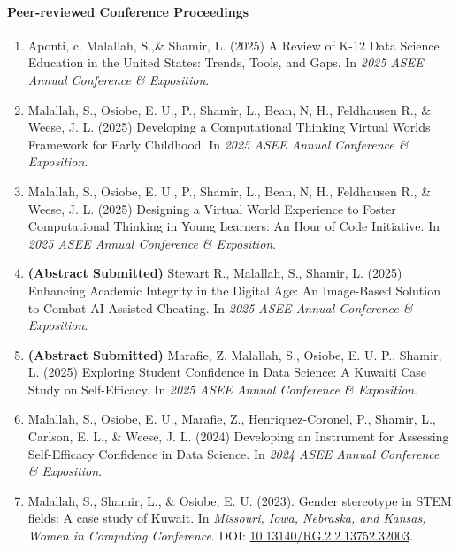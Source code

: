 \documentclass[11pt]{article}
\begin{document}
\paragraph{Peer-reviewed Conference Proceedings}
\begin{enumerate}
\item Aponti, c. Malallah, S.,\& Shamir, L. (2025) A Review of K-12 Data Science Education in the United States: Trends, Tools, and Gaps. In \textit{2025 ASEE Annual Conference \& Exposition}.

\item Malallah, S., Osiobe, E. U., P., Shamir, L., Bean, N, H., Feldhausen R., \& Weese, J. L. (2025) Developing a Computational Thinking Virtual Worlds Framework for Early Childhood. In \textit{2025 ASEE Annual Conference \& Exposition}.


\item Malallah, S., Osiobe, E. U., P., Shamir, L., Bean, N, H., Feldhausen R., \& Weese, J. L. (2025) Designing a Virtual World Experience to Foster Computational Thinking in Young Learners: An Hour of Code Initiative. In \textit{2025 ASEE Annual Conference \& Exposition}.

\item \textbf{(Abstract Submitted)} Stewart R., Malallah, S., Shamir, L. (2025) Enhancing Academic Integrity in the Digital Age: An Image-Based Solution to Combat AI-Assisted Cheating. In \textit{2025 ASEE Annual Conference \& Exposition}.

\item \textbf{(Abstract Submitted)} Marafie, Z. Malallah, S., Osiobe, E. U. P., Shamir, L. (2025) Exploring Student Confidence in Data Science: A Kuwaiti Case Study on Self-Efficacy. In \textit{2025 ASEE Annual Conference \& Exposition}.


\item Malallah, S., Osiobe, E. U., Marafie, Z., Henriquez-Coronel, P., Shamir, L., Carlson, E. L., \& Weese, J. L. (2024) Developing an Instrument for Assessing Self-Efficacy Confidence in Data Science. In \textit{2024 ASEE Annual Conference \& Exposition}.

\item Malallah, S., Shamir, L., \& Osiobe, E. U. (2023). Gender stereotype in STEM fields: A case study of Kuwait. In \textit{Missouri, Iowa, Nebraska, and Kansas, Women in Computing Conference}. DOI: \href{https://doi.org/10.13140/RG.2.2.13752.32003}{10.13140/RG.2.2.13752.32003}. 


\end{enumerate}
\end{document}
